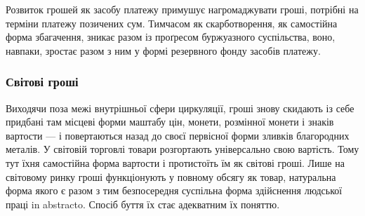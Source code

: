
Розвиток грошей як засобу платежу примушує нагромаджувати
гроші, потрібні на терміни платежу позичених сум. Тимчасом
як скарботворення, як самостійна форма збагачення, зникає
разом із проґресом буржуазного суспільства, воно, навпаки,
зростає разом з ним у формі резервного фонду засобів платежу.

\manualpagebreak{}
\subsubsection{Світові гроші}

Виходячи поза межі внутрішньої сфери циркуляції, гроші
знову скидають із себе придбані там місцеві форми маштабу
цін, монети, розмінної монети і знаків вартости — і повертаються
назад до своєї первісної форми зливків благородних
металів. У світовій торговлі товари розгортають універсально
свою вартість. Тому тут їхня самостійна форма вартости і протистоїть
їм як світові гроші. Лише на світовому ринку гроші функціонують
у повному обсягу як товар, натуральна форма якого
є разом з тим безпосередня суспільна форма здійснення людської
праці in abstracto. Спосіб буття їх стає адекватним їх поняттю.

